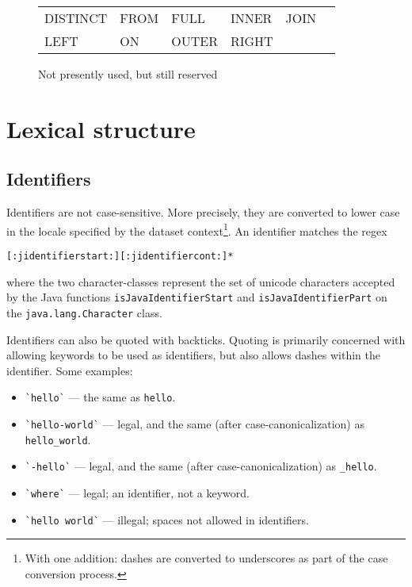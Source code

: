 \documentclass{article}
\begin{document}
\begin{figure}
\begin{center}
\begin{tabular}{l l l l l l}
DISTINCT & FROM & FULL  & INNER & JOIN \\
LEFT     & ON   & OUTER & RIGHT        \\
\end{tabular}
\end{center}
\caption{Not presently used, but still reserved}
\label{futurewords}
\end{figure}

\section{Lexical structure}

\subsection{Identifiers}
Identifiers are not case-sensitive.  More precisely, they are
converted to lower case in the locale specified by the dataset
context\footnote{With one addition: dashes are converted to
  underscores as part of the case conversion process.}.  An
identifier matches the regex
\begin{lstlisting}
[:jidentifierstart:][:jidentifiercont:]*
\end{lstlisting}
where the two character-classes represent the set of unicode
characters accepted by the Java functions
\lstinline|isJavaIdentifierStart| and \lstinline|isJavaIdentifierPart|
on the \lstinline|java.lang.Character| class.

Identifiers can also be quoted with backticks.  Quoting is primarily
concerned with allowing keywords to be used as identifiers, but also
allows dashes within the identifier.  Some examples:
\begin{itemize}
\item \lstinline!`hello`! --- the same as \lstinline!hello!.
\item \lstinline!`hello-world`! --- legal, and the same (after case-canonicalization) as \lstinline!hello_world!.
\item \lstinline!`-hello`! --- legal, and the same (after case-canonicalization) as \lstinline!_hello!.
\item \lstinline!`where`! --- legal; an identifier, not a keyword.
\item \lstinline!`hello world`! --- illegal; spaces not allowed in identifiers.
\end{itemize}
\end{document}
